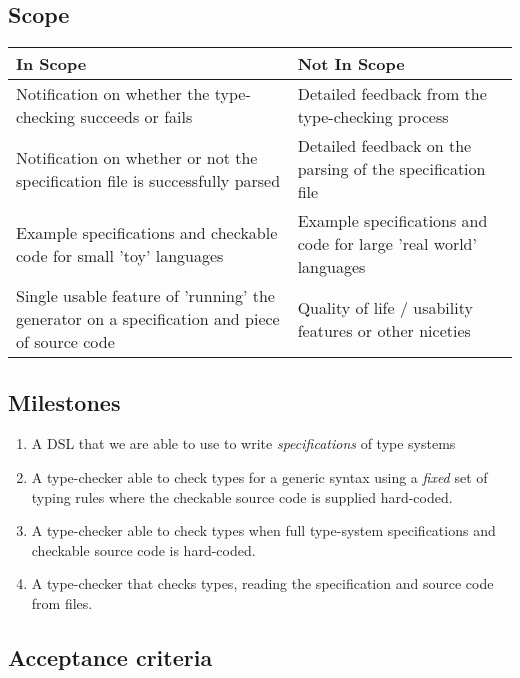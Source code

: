   \subsection{Scope}
  \label{sec-scope}

  \begin{center}
  \begin{tabular}{p{20em}|p{18em}}
    \large In Scope & \large Not In Scope \\ \hline \hline
    Notification on whether the type-checking succeeds
    or fails
    & Detailed feedback from the type-checking process \\ \hline
    Notification on whether or not the specification file is
    successfully parsed
    & Detailed feedback on the parsing of the specification file \\ \hline
    Example specifications and checkable code for small 'toy' languages
    & Example specifications and code for large 'real world' languages \\ \hline
    Single usable feature of 'running' the generator on a
    specification and piece of source code
    & Quality of life / usability features or other niceties \\ \hline
  \end{tabular}            
  \end{center}        
  
  \subsection{Milestones}
  \label{section-milestones}

  \begin{enumerate}
  \item A DSL that we are able to use to write \emph{specifications}
    of type systems
  \item A type-checker able to check types for a generic syntax
    using a \emph{fixed} set of typing rules where the checkable
    source code is supplied hard-coded.
  \item A type-checker able to check types when full type-system
    specifications and checkable source code is hard-coded.
  \item A type-checker  that checks types, reading
    the specification and source code from files.
  \end{enumerate}
  
  \subsection{Acceptance criteria}
  \label{sec-acceptance}

